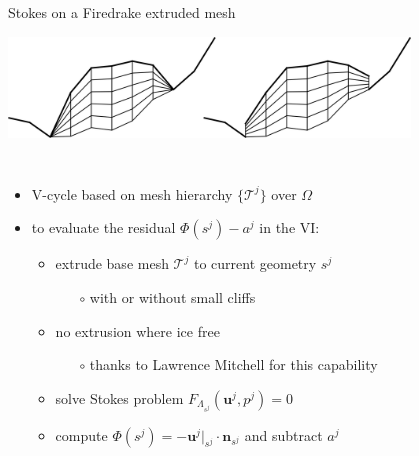 \documentclass[usepdftitle=false,usenames,dvipsnames]{beamer}
\newcommand{\bn}{\mathbf{n}}
\newcommand{\bu}{\mathbf{u}}
\begin{document}
\begin{frame}{Stokes on a Firedrake extruded mesh}

\begin{center}
\includegraphics[width=0.8\textwidth]{figs/extruded.png}
\end{center}

\begin{columns}
\begin{itemize}
\item V-cycle based on mesh hierarchy $\{\mathcal{T}^j\}$ over $\Omega$
\item to evaluate the residual $\Phi(s^j) - a^j$ in the VI:
    \begin{itemize}
    \item extrude base mesh $\mathcal{T}^j$ to current geometry $s^j$
        \begin{itemize}
        \item[{\color{black} $\circ$}] with or without small cliffs
        \end{itemize}
    \item no extrusion where ice free
        \begin{itemize}
        \item[{\color{black} $\circ$}] thanks to Lawrence Mitchell for this capability
        \end{itemize}
    \item solve Stokes problem $F_{\Lambda_{s^j}}(\bu^j,p^j)=0$
    \item compute $\Phi(s^j) = - \bu^j|_{s^j} \cdot \bn_{s^j}$ and subtract $a^j$
    \end{itemize}
\end{itemize}

\end{columns}
\end{frame}
\end{document}
